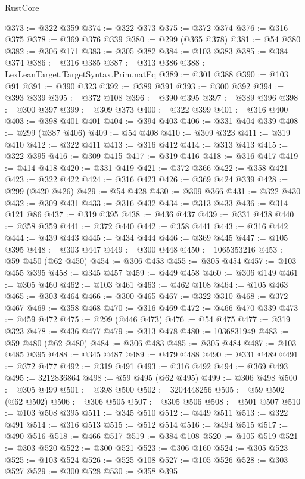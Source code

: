 \begin{lexlean}{RustCore}
\begin{coremodule}
@373 := @322 @359
@374 := @322 @373
@375 := @372 @374
@376 := @316 @375
@378 := @369 @376 @339
@380 := @299 (@365 @378)
@381 := @54 @380
@382 := @306 @171
@383 := @305 @382
@384 := @103 @383
@385 := @384 @374
@386 := @316 @385
@387 := @313 @386
@388 := LexLeanTarget.TargetSyntax.Prim.natEq
@389 := @301 @388
@390 := @103 @91
@391 := @390 @323
@392 := @389 @391
@393 := @300 @392
@394 := @393 @339
@395 := @372 @108
@396 := @390 @395
@397 := @389 @396
@398 := @300 @397
@399 := @309 @373
@400 := @322 @399
@401 := @316 @400
@403 := @398 @401 @401
@404 := @394 @403
@406 := @331 @404 @339
@408 := @299 (@387 @406)
@409 := @54 @408
@410 := @309 @323
@411 := @319 @410
@412 := @322 @411
@413 := @316 @412
@414 := @313 @413
@415 := @322 @395
@416 := @309 @415
@417 := @319 @416
@418 := @316 @417
@419 := @414 @418
@420 := @331 @419
@421 := @372 @366
@422 := @358 @421
@423 := @322 @422
@424 := @316 @423
@426 := @369 @424 @339
@428 := @299 (@420 @426)
@429 := @54 @428
@430 := @309 @366
@431 := @322 @430
@432 := @309 @431
@433 := @316 @432
@434 := @313 @433
@436 := @314 @121 @86
@437 := @319 @395
@438 := @436 @437
@439 := @331 @438
@440 := @358 @359
@441 := @372 @440
@442 := @358 @441
@443 := @316 @442
@444 := @439 @443
@445 := @434 @444
@446 := @369 @445
@447 := @105 @395
@448 := @303 @447
@449 := @300 @448
@450 := 1065353216
@453 := @59 @450 (@62 @450)
@454 := @306 @453
@455 := @305 @454
@457 := @103 @455 @395
@458 := @345 @457
@459 := @449 @458
@460 := @306 @149
@461 := @305 @460
@462 := @103 @461
@463 := @462 @108
@464 := @105 @463
@465 := @303 @464
@466 := @300 @465
@467 := @322 @310
@468 := @372 @467
@469 := @358 @468
@470 := @316 @469
@472 := @466 @470 @339
@473 := @459 @472
@475 := @299 (@446 @473)
@476 := @54 @475
@477 := @319 @323
@478 := @436 @477
@479 := @313 @478
@480 := 1036831949
@483 := @59 @480 (@62 @480)
@484 := @306 @483
@485 := @305 @484
@487 := @103 @485 @395
@488 := @345 @487
@489 := @479 @488
@490 := @331 @489
@491 := @372 @477
@492 := @319 @491
@493 := @316 @492
@494 := @369 @493
@495 := 3212836864
@498 := @59 @495 (@62 @495)
@499 := @306 @498
@500 := @305 @499
@501 := @398 @500
@502 := 3204448256
@505 := @59 @502 (@62 @502)
@506 := @306 @505
@507 := @305 @506
@508 := @501 @507
@510 := @103 @508 @395
@511 := @345 @510
@512 := @449 @511
@513 := @322 @491
@514 := @316 @513
@515 := @512 @514
@516 := @494 @515
@517 := @490 @516
@518 := @466 @517
@519 := @384 @108
@520 := @105 @519
@521 := @303 @520
@522 := @300 @521
@523 := @306 @160
@524 := @305 @523
@525 := @103 @524
@526 := @525 @108
@527 := @105 @526
@528 := @303 @527
@529 := @300 @528
@530 := @358 @395

\end{coremodule}
\end{lexlean}
